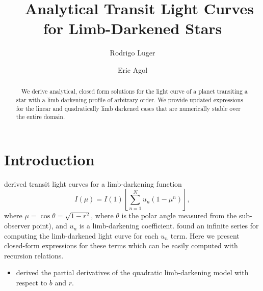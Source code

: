 \documentclass[modern]{aastex61}
\begin{document}

\setlength{\abovedisplayskip}{1.5em}
\setlength{\belowdisplayskip}{1.5em}

\title{%
    Analytical Transit Light Curves for Limb-Darkened Stars
}

\author[0000-0002-0296-3826]{Rodrigo Luger}
\author{Eric Agol}


\begin{abstract}
    We derive analytical, closed form solutions for the light curve
    of a planet transiting a star with a limb darkening profile of
    arbitrary order. We provide updated expressions for the linear
    and quadratically limb darkened cases that are numerically stable
    over the entire domain.
\end{abstract}

%
\section{Introduction}
\label{sec:intro}

\citet{Gimenez2006} derived transit light curves for a limb-darkening
function
\begin{equation}
I(\mu) = I(1) \left[\sum_{n=1}^N u_n (1-\mu^n) \right],
\end{equation}
where $\mu = \cos{\theta} =\sqrt{1-r^2}$, where $\theta$ is the polar angle measured from the
sub-observer point), and $u_n$ is a limb-darkening coefficient.  \cite{Gimenez2006}
found an infinite series for computing the limb-darkened light curve for each $u_n$
term.  Here we present closed-form expressions for these terms which can be
easily computed with recursion relations.


\begin{itemize}
\item \cite{Pal2008} derived the partial derivatives of the quadratic limb-darkening model
with respect to $b$ and $r$.
\end{itemize}
\end{document}
